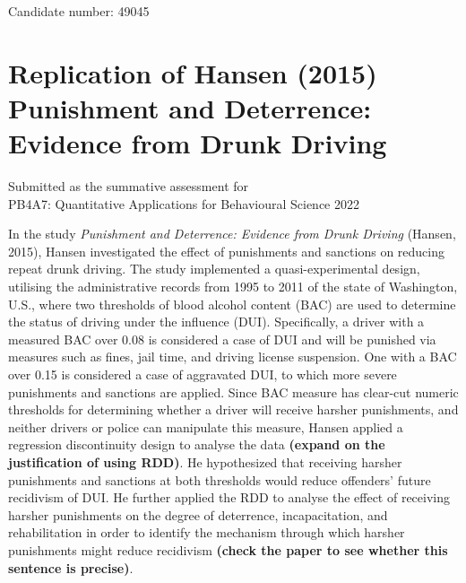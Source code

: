 \documentclass[
  11pt,
]{article}
\author{}
\date{\vspace{-2.5em}}
\begin{document}
\begin{titlepage}

\begin{center}

\vspace*{30mm}

Candidate number: 49045

\vspace*{5mm}

\hypertarget{replication-of-hansen-2015-punishment-and-deterrence-evidence-from-drunk-driving}{%
\section*{Replication of Hansen (2015) Punishment and Deterrence:
Evidence from Drunk
Driving}\label{replication-of-hansen-2015-punishment-and-deterrence-evidence-from-drunk-driving}}

\vspace*{30mm}

Submitted as the summative assessment for\\

PB4A7: Quantitative Applications for Behavioural Science 2022

\end{center}

\end{titlepage}

\newpage

In the study \emph{Punishment and Deterrence: Evidence from Drunk
Driving} (Hansen, 2015), Hansen investigated the effect of punishments
and sanctions on reducing repeat drunk driving. The study implemented a
quasi-experimental design, utilising the administrative records from
1995 to 2011 of the state of Washington, U.S., where two thresholds of
blood alcohol content (BAC) are used to determine the status of driving
under the influence (DUI). Specifically, a driver with a measured BAC
over 0.08 is considered a case of DUI and will be punished via measures
such as fines, jail time, and driving license suspension. One with a BAC
over 0.15 is considered a case of aggravated DUI, to which more severe
punishments and sanctions are applied. Since BAC measure has clear-cut
numeric thresholds for determining whether a driver will receive harsher
punishments, and neither drivers or police can manipulate this measure,
Hansen applied a regression discontinuity design to analyse the data
\textbf{(expand on the justification of using RDD)}. He hypothesized
that receiving harsher punishments and sanctions at both thresholds
would reduce offenders' future recidivism of DUI. He further applied the
RDD to analyse the effect of receiving harsher punishments on the degree
of deterrence, incapacitation, and rehabilitation in order to identify
the mechanism through which harsher punishments might reduce recidivism
\textbf{(check the paper to see whether this sentence is precise)}.
\end{document}
